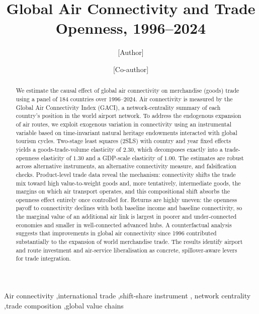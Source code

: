 \begin{frontmatter}

\title{Global Air Connectivity and Trade Openness, 1996--2024}

\author[a]{[Author]}
\ead{[email]}
\author[a]{[Co-author]}
\address[a]{[Affiliation]}

\begin{abstract}
We estimate the causal effect of global air connectivity on merchandise (goods) trade using a panel of 184 countries over 1996--2024. Air connectivity is measured by the Global Air Connectivity Index (GACI), a
network-centrality summary of each country's position in the world airport network. To address the endogenous expansion of air routes, we exploit exogenous variation in connectivity using an instrumental variable based on time-invariant natural heritage endowments interacted with global tourism cycles. Two-stage least squares (2SLS) with country and year fixed effects yields a goods-trade-volume elasticity of $2.30$, which decomposes exactly into a trade-openness elasticity of $1.30$ and a GDP-scale elasticity of $1.00$. The estimates are robust across alternative instruments, an alternative connectivity measure, and falsification checks. Product-level trade data reveal the mechanism: connectivity shifts the trade mix toward high value-to-weight goods and, more tentatively, intermediate goods, the margins on which air transport operates, and this compositional shift absorbs the openness effect entirely once controlled for. Returns are highly uneven: the openness payoff to connectivity declines with both baseline income and baseline connectivity, so the marginal value of an additional air link is largest in poorer and under-connected economies and smaller in well-connected advanced hubs. A counterfactual analysis suggests that improvements in global air connectivity since 1996 contributed substantially to the expansion of world merchandise trade. The results identify airport and route investment and air-service liberalisation as concrete, spillover-aware levers for trade integration.
\end{abstract}

\begin{keyword}
Air connectivity \sep international trade \sep shift-share instrument \sep
network centrality \sep trade composition \sep global value chains
\end{keyword}

\end{frontmatter}

